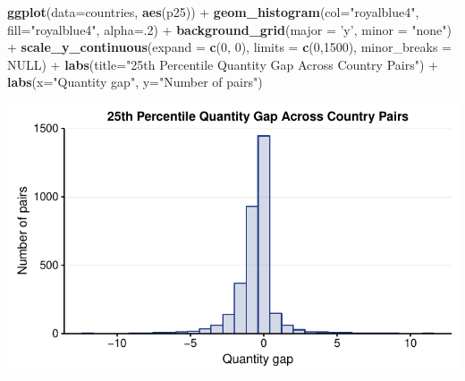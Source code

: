 \documentclass[10pt,]{article}
\newenvironment{Shaded}{\begin{snugshade}}{\end{snugshade}}
\newcommand{\KeywordTok}[1]{\textcolor[rgb]{0.13,0.29,0.53}{\textbf{{#1}}}}
\newcommand{\DataTypeTok}[1]{\textcolor[rgb]{0.13,0.29,0.53}{{#1}}}
\newcommand{\DecValTok}[1]{\textcolor[rgb]{0.00,0.00,0.81}{{#1}}}
\newcommand{\StringTok}[1]{\textcolor[rgb]{0.31,0.60,0.02}{{#1}}}
\newcommand{\OtherTok}[1]{\textcolor[rgb]{0.56,0.35,0.01}{{#1}}}
\newcommand{\NormalTok}[1]{{#1}}
\begin{document}
\begin{Shaded}
\begin{Highlighting}[]
\KeywordTok{ggplot}\NormalTok{(}\DataTypeTok{data=}\NormalTok{countries, }\KeywordTok{aes}\NormalTok{(p25)) +}
\StringTok{  }\KeywordTok{geom_histogram}\NormalTok{(}\DataTypeTok{col=}\StringTok{"royalblue4"}\NormalTok{,}
                 \DataTypeTok{fill=}\StringTok{"royalblue4"}\NormalTok{,}
                 \DataTypeTok{alpha=}\NormalTok{.}\DecValTok{2}\NormalTok{) +}
\StringTok{  }\KeywordTok{background_grid}\NormalTok{(}\DataTypeTok{major =} \StringTok{'y'}\NormalTok{, }\DataTypeTok{minor =} \StringTok{"none"}\NormalTok{) +}
\StringTok{  }\KeywordTok{scale_y_continuous}\NormalTok{(}\DataTypeTok{expand =} \KeywordTok{c}\NormalTok{(}\DecValTok{0}\NormalTok{, }\DecValTok{0}\NormalTok{), }\DataTypeTok{limits =} \KeywordTok{c}\NormalTok{(}\DecValTok{0}\NormalTok{,}\DecValTok{1500}\NormalTok{), }\DataTypeTok{minor_breaks =} \OtherTok{NULL}\NormalTok{) +}
\StringTok{  }\KeywordTok{labs}\NormalTok{(}\DataTypeTok{title=}\StringTok{"25th Percentile Quantity Gap Across Country Pairs"}\NormalTok{) +}
\StringTok{  }\KeywordTok{labs}\NormalTok{(}\DataTypeTok{x=}\StringTok{"Quantity gap"}\NormalTok{, }\DataTypeTok{y=}\StringTok{"Number of pairs"}\NormalTok{)}
\end{Highlighting}
\end{Shaded}

\begin{center}\includegraphics{Figs/quantity_pairs-3} \end{center}
\end{document}
